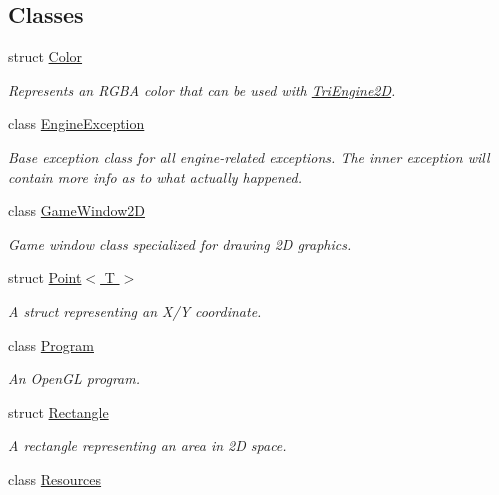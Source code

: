 \subsection*{Classes}
\begin{DoxyCompactItemize}
\item 
struct \hyperlink{struct_tri_devs_1_1_tri_engine2_d_1_1_color}{Color}
\begin{DoxyCompactList}\small\item\em Represents an R\-G\-B\-A color that can be used with \hyperlink{namespace_tri_devs_1_1_tri_engine2_d}{Tri\-Engine2\-D}. \end{DoxyCompactList}\item 
class \hyperlink{class_tri_devs_1_1_tri_engine2_d_1_1_engine_exception}{Engine\-Exception}
\begin{DoxyCompactList}\small\item\em Base exception class for all engine-\/related exceptions. The inner exception will contain more info as to what actually happened. \end{DoxyCompactList}\item 
class \hyperlink{class_tri_devs_1_1_tri_engine2_d_1_1_game_window2_d}{Game\-Window2\-D}
\begin{DoxyCompactList}\small\item\em Game window class specialized for drawing 2\-D graphics. \end{DoxyCompactList}\item 
struct \hyperlink{struct_tri_devs_1_1_tri_engine2_d_1_1_point_3_01_t_01_4}{Point$<$ T $>$}
\begin{DoxyCompactList}\small\item\em A struct representing an X/\-Y coordinate. \end{DoxyCompactList}\item 
class \hyperlink{class_tri_devs_1_1_tri_engine2_d_1_1_program}{Program}
\begin{DoxyCompactList}\small\item\em An Open\-G\-L program. \end{DoxyCompactList}\item 
struct \hyperlink{struct_tri_devs_1_1_tri_engine2_d_1_1_rectangle}{Rectangle}
\begin{DoxyCompactList}\small\item\em A rectangle representing an area in 2\-D space. \end{DoxyCompactList}\item 
class \hyperlink{class_tri_devs_1_1_tri_engine2_d_1_1_resources}{Resources}

\end{DoxyCompactItemize}
